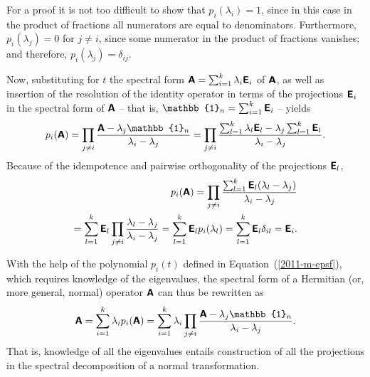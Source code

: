 {\color{OliveGreen}\bproof

For a proof  it is not too difficult
to show that
$p_i  (\lambda_i)=1$, since in this case in the product of fractions all numerators are equal to denominators.
Furthermore,
$p_i  (\lambda_j)=0$ for $j\neq i $, since some numerator in the product of fractions vanishes; and
therefore,
$p_i  (\lambda_j)=\delta_{ij}$.

Now, substituting for $t$ the spectral form $\textsf{\textbf{A}}=\sum_{i=1}^k \lambda_i\textsf{\textbf{E}}_i$
of $\textsf{\textbf{A}}$, as well as insertion of the
resolution of the identity operator in terms of the projections $\textsf{\textbf{E}}_i$ in the spectral form of
$\textsf{\textbf{A}}$ -- that is, $\mathbb{1}_n=\sum_{i=1}^k \textsf{\textbf{E}}_i$ --
yields
\begin{equation}
p_i  (\textsf{\textbf{A}})
=
\prod_{
j\neq i
}\frac{\textsf{\textbf{A}} - \lambda_j\mathbb{1}_n}{\lambda_i -\lambda_j}
=
\prod_{
j\neq i
}\frac{\sum_{l=1}^k \lambda_l\textsf{\textbf{E}}_l - \lambda_j\sum_{l=1}^k \textsf{\textbf{E}}_l}{\lambda_i -\lambda_j}
.
\end{equation}
Because of the idempotence and pairwise orthogonality of the projections  $\textsf{\textbf{E}}_l$,
\begin{equation}
\begin{split}
p_i  (\textsf{\textbf{A}}) =
\prod_{
j\neq i
}\frac{\sum_{l=1}^k \textsf{\textbf{E}}_l(\lambda_l- \lambda_j)}{\lambda_i -\lambda_j}   \\
= \sum_{l=1}^k \textsf{\textbf{E}}_l
\prod_{
j\neq i
}\frac{\lambda_l- \lambda_j}{\lambda_i -\lambda_j}
= \sum_{l=1}^k \textsf{\textbf{E}}_l
p_i  (\lambda_l)
= \sum_{l=1}^k \textsf{\textbf{E}}_l
\delta_{il} = \textsf{\textbf{E}}_i.
\label{2012-m-ch-fdvs-cc}
\end{split}
\end{equation}
\eproof
}

With the help of the polynomial $p_i(t)$ defined in Equation~(\ref{2011-m-epsf}),
which requires knowledge of the eigenvalues,
the spectral form of a Hermitian (or, more general, normal) operator  $\textsf{\textbf{A}}$ can thus be rewritten as
\begin{equation}
\textsf{\textbf{A}}=\sum_{i=1}^k \lambda_i p_i(\textsf{\textbf{A}})=  \sum_{i=1}^k \lambda_i \prod_{
j\neq i
}\frac{\textsf{\textbf{A}} - \lambda_j\mathbb{1}_n}{\lambda_i -\lambda_j}.
\end{equation}
That is, knowledge of all the eigenvalues entails construction
of all the projections in the spectral decomposition
of a normal transformation.



